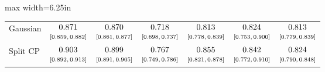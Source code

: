 \begin{table}[htbp]
\begin{adjustbox}{max width=6.25in}
\begin{tabular}{lcccccc}
Gaussian & $\begin{array}{@{}c@{}}0.871\\[-1pt] \scriptstyle[0.859,\,0.882]\end{array}$ & $\begin{array}{@{}c@{}}0.870\\[-1pt] \scriptstyle[0.861,\,0.877]\end{array}$ & $\begin{array}{@{}c@{}}0.718\\[-1pt] \scriptstyle[0.698,\,0.737]\end{array}$ & $\begin{array}{@{}c@{}}0.813\\[-1pt] \scriptstyle[0.778,\,0.839]\end{array}$ & $\begin{array}{@{}c@{}}0.824\\[-1pt] \scriptstyle[0.753,\,0.900]\end{array}$ & $\begin{array}{@{}c@{}}0.813\\[-1pt] \scriptstyle[0.779,\,0.839]\end{array}$ \\
Split CP & $\begin{array}{@{}c@{}}0.903\\[-1pt] \scriptstyle[0.892,\,0.913]\end{array}$ & $\begin{array}{@{}c@{}}0.899\\[-1pt] \scriptstyle[0.891,\,0.905]\end{array}$ & $\begin{array}{@{}c@{}}0.767\\[-1pt] \scriptstyle[0.749,\,0.786]\end{array}$ & $\begin{array}{@{}c@{}}0.855\\[-1pt] \scriptstyle[0.821,\,0.878]\end{array}$ & $\begin{array}{@{}c@{}}0.842\\[-1pt] \scriptstyle[0.772,\,0.910]\end{array}$ & $\begin{array}{@{}c@{}}0.824\\[-1pt] \scriptstyle[0.790,\,0.848]\end{array}$ \\

\end{tabular}
\end{adjustbox}
\end{table}
